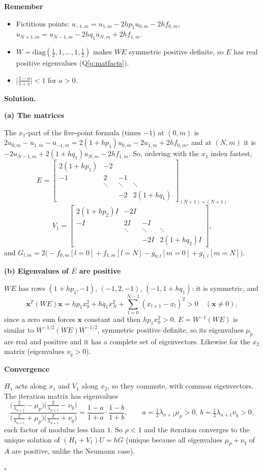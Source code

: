 \documentclass[11pt,a4paper]{article}
\newenvironment{rem}
  {\begin{remember}\noindent\textbf{Remember}\par\nobreak\vspace{-0.3em}}
  {\end{remember}}
\newenvironment{solution}
  {\par\noindent\textbf{Solution.}\par\nobreak}
  {\par\nobreak\noindent\hfill\(\square\)\par}
\newcommand{\step}[1]{\par\addvspace{0.5em}\noindent\textbf{#1}\par\nobreak}
\newcommand{\lam}{\lambda_{n+1}}
\begin{document}
\begin{rem}
\begin{itemize}
  \item Fictitious points:
    \(u_{-1,m}=u_{1,m}-2hp_1u_{0,m}-2hf_{0,m}\),
    \(u_{N+1,m}=u_{N-1,m}-2hq_1u_{N,m}+2hf_{1,m}\).
  \item \(W=\mathrm{diag}(\frac12,1,\dots,1,\frac12)\) makes \(WE\)
    symmetric positive definite, so \(E\) has real positive
    eigenvalues (Q\ref{q:matfacts}).
  \item \(\bigl|\frac{1-a}{1+a}\bigr|<1\) for \(a>0\).
\end{itemize}
\end{rem}

\begin{solution}
\step{(a) The matrices}
The \(x_1\)-part of the five-point formula (times \(-1\)) at \((0,m)\)
is \(2u_{0,m}-u_{1,m}-u_{-1,m}=2(1+hp_1)u_{0,m}-2u_{1,m}+2hf_{0,m}\),
and at \((N,m)\) it is \(-2u_{N-1,m}+2(1+hq_1)u_{N,m}-2hf_{1,m}\).  So,
ordering with the \(x_1\) index fastest,
\[
  E=\begin{bmatrix}2(1+hp_1)&-2&&\\-1&2&-1&\\&\ddots&\ddots&\ddots\\&&-2&2(1+hq_1)\end{bmatrix}_{(N+1)\times(N+1)}
\]
\[
  V_1=\begin{bmatrix}2(1+hp_2)I&-2I&&\\-I&2I&-I&\\&\ddots&\ddots&\ddots\\&&-2I&2(1+hq_2)I\end{bmatrix},
\]
and \(G_{l,m}=2\bigl(-f_{0,m}[l=0]+f_{1,m}[l=N]-g_{0,l}[m=0]+g_{1,l}[m=N]\bigr)\).

\step{(b) Eigenvalues of \(E\) are positive}
\(WE\) has rows \((1+hp_1,-1)\), \((-1,2,-1)\), \((-1,1+hq_1)\): it is
symmetric, and
\[
  \mathbf x^T(WE)\mathbf x=hp_1x_0^2+hq_1x_N^2+\sum_{l=0}^{N-1}(x_{l+1}-x_l)^2>0
  \quad(\mathbf x\ne0),
\]
since a zero sum forces \(\mathbf x\) constant and then
\(hp_1x_0^2>0\).  \(E=W^{-1}(WE)\) is similar to
\(W^{-1/2}(WE)W^{-1/2}\), symmetric positive definite, so its
eigenvalues \(\mu_p\) are real and positive and it has a complete set
of eigenvectors.  Likewise for the \(x_2\) matrix (eigenvalues
\(\nu_q>0\)).

\step{Convergence}
\(H_1\) acts along \(x_1\) and \(V_1\) along \(x_2\), so they commute,
with common eigenvectors.  The iteration matrix has eigenvalues
\[
  \frac{\bigl(\frac2{\lam}-\mu_p\bigr)\bigl(\frac2{\lam}-\nu_q\bigr)}{\bigl(\frac2{\lam}+\mu_p\bigr)\bigl(\frac2{\lam}+\nu_q\bigr)}
  =\frac{1-a}{1+a}\cdot\frac{1-b}{1+b},
  \qquad a=\tfrac12\lam\mu_p>0,\ b=\tfrac12\lam\nu_q>0,
\]
each factor of modulus less than \(1\).  So \(\rho<1\) and the
iteration converges to the unique solution of \((H_1+V_1)U=hG\)
(unique because all eigenvalues \(\mu_p+\nu_q\) of \(A\) are positive,
unlike the Neumann case).
\end{solution}
\end{document}
